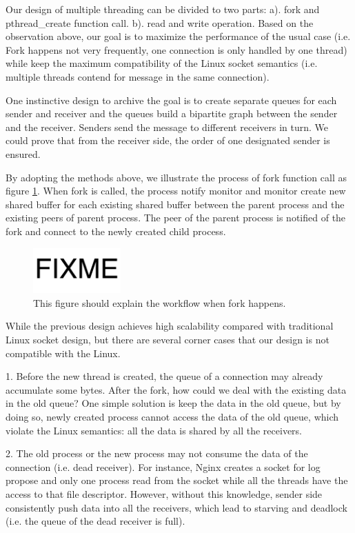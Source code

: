 Our design of multiple threading can be divided to two parts: a). fork and pthread\_create function call. b). read and write operation. Based on the observation above, our goal is to maximize the performance of the usual case (i.e. Fork happens not very frequently, one connection is only handled by one thread) while keep the maximum compatibility of the Linux socket semantics (i.e. multiple threads contend for message in the same connection).

One instinctive design to archive the goal is to create separate queues for each sender and receiver and the queues build a bipartite graph between the sender and the receiver. Senders send the message to different receivers in turn. We could prove that from the receiver side, the order of one designated sender is ensured.

By adopting the methods above, we illustrate the process of fork function call as figure \ref{fig:fork-process}. When fork is called, the process notify monitor and monitor create new shared buffer for each existing shared buffer between the parent process and the existing peers of parent process. The peer of the parent process is notified of the fork and connect to the newly created child process.

\begin{figure}[t]
	\centering
	\includegraphics[width=0.3\textwidth]{images/fixme}
	\caption{This figure should explain the workflow when fork happens.}
	\label{fig:fork-process}
\end{figure}

While the previous design achieves high scalability compared with traditional Linux socket design, but there are several corner cases that our design is not compatible with the Linux.

1. Before the new thread is created, the queue of a connection may already accumulate some bytes. After the fork, how could we deal with the existing data in the old queue? One simple solution is keep the data in the old queue, but by doing so, newly created process cannot access the data of the old queue, which violate the Linux semantics: all the data is shared by all the receivers. 

2. The old process or the new process may not consume the data of the connection (i.e. dead receiver). For instance, Nginx creates a socket for log propose and only one process read from the socket while all the threads have the access to that file descriptor. However, without this knowledge, sender side consistently push data into all the receivers, which lead to starving and deadlock (i.e. the queue of the dead receiver is full).

